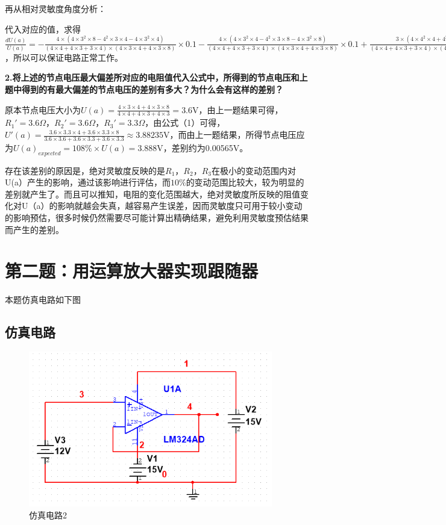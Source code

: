 \documentclass[UTF8]{ctexart}
\begin{document}
再从相对灵敏度角度分析：

代入对应的值，求得$\frac{dU(a)}{U(a)}=-\frac{4\times(4\times3^2\times8-4^2\times3\times4-4\times3^2\times4)}{(4\times4+4\times3+3\times4)\times(4\times3\times4+4\times3\times8)}\times0.1-\frac{4\times(4\times3^2\times4-4^2\times3\times8-4\times3^2\times8)}{(4\times4+4\times3+3\times4)\times(4\times3\times4+4\times3\times8)}\times0.1+\frac{3\times(4\times4^2\times4+4^2\times4\times8))}{(4\times4+4\times3+3\times4)\times(4\times3\times4+4\times3\times8)}\times0.1=8\%<10\%$，所以可以保证电路正常工作。


\textbf{2.将上述的节点电压最大偏差所对应的电阻值代入公式中，所得到的节点电压和上题中得到的有最大偏差的节点电压的差别有多大？为什么会有这样的差别？}

原本节点电压大小为$U(a)=\frac{4\times3\times4+4\times3\times8}{4\times4+4\times3+4\times3}=3.6$V，由上一题结果可得，$R_1'=3.6\Omega$，$R_2'=3.6\Omega$，$R_3'=3.3\Omega$，由公式（1）可得，$U'(a)=\frac{3.6\times3.3\times4+3.6\times3.3\times8}{3.6\times3.6+3.6\times3.3+3.6\times3.3} \approx3.88235$V，而由上一题结果，所得节点电压应为$U(a)_{expected}=108\%\times U(a)=3.888$V，差别约为0.00565V。

存在该差别的原因是，绝对灵敏度反映的是$R_1$，$R_2$，$R_3$在极小的变动范围内对U(a）产生的影响，通过该影响进行评估，而$10\%$的变动范围比较大，较为明显的差别就产生了。而且可以推知，电阻的变化范围越大，绝对灵敏度所反映的阻值变化对U（a）的影响就越会失真，越容易产生误差，因而灵敏度只可用于较小变动的影响预估，很多时候仍然需要尽可能计算出精确结果，避免利用灵敏度预估结果而产生的差别。
\section{第二题：用运算放大器实现跟随器}
本题仿真电路如下图
\subsection{仿真电路}
\begin{figure}[H]
\centering
\includegraphics[width=0.95\textwidth]{C.png}
\caption{仿真电路2}
\end{figure}
\end{document}
